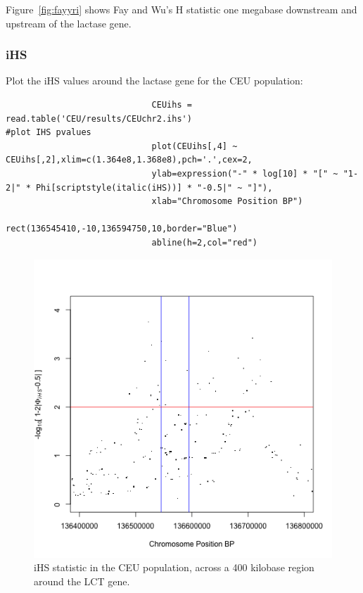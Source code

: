 \documentclass[a4paper,10pt]{article}
\begin{document}
                             \noindent
                             Figure~\ref{fig:fayyri} shows Fay and Wu's H statistic one megabase
                             downstream and upstream of the lactase gene.

                             \subsubsection{iHS}
                             Plot the iHS values around the lactase gene for the CEU population:\\
                             \begin{verbatim}
                             CEUihs = read.table('CEU/results/CEUchr2.ihs')
#plot IHS pvalues
                             plot(CEUihs[,4] ~ CEUihs[,2],xlim=c(1.364e8,1.368e8),pch='.',cex=2,
                             ylab=expression("-" * log[10] * "[" ~ "1-2|" * Phi[scriptstyle(italic(iHS))] * "-0.5|" ~ "]"),
                             xlab="Chromosome Position BP") 
                             rect(136545410,-10,136594750,10,border="Blue") 
                             abline(h=2,col="red")
                             \end{verbatim}

                             \begin{figure}
                             \centering
                             \includegraphics{pictures/CEUihs.png}
                             \caption{iHS statistic in the CEU population, across a 400 kilobase region around the LCT gene. }  
                             \label{fig:ceuihs}
                             \end{figure}
\end{document}
